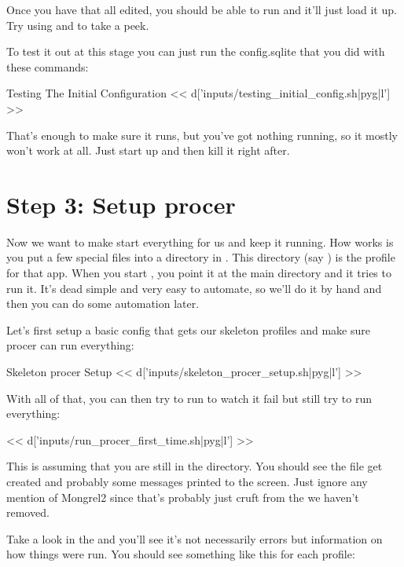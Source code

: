 Once you have that all edited, you should be able to run  and it'll just load it up.  Try using
 and  to take a peek.


To test it out at this stage you can just run the config.sqlite that you
did with these commands:

\begin{code}{Testing The Initial Configuration}
<< d['inputs/testing_initial_config.sh|pyg|l'] >>
\end{code}

That's enough to make sure it runs, but you've got nothing running,
so it mostly won't work at all.  Just start up and then kill it
right after.


\section{Step 3: Setup procer}

Now we want to make  start everything for us and keep
it running.  How  works is you put a few special
files into a directory in .  This directory (say )
is the profile for that app.  When you start , you
point it at the main  directory and it tries to run it.
It's dead simple and very easy to automate, so we'll do it by hand
and then you can do some automation later.

Let's first setup a basic config that gets our skeleton profiles
and make sure procer can run everything:

\begin{code}{Skeleton procer Setup}
<< d['inputs/skeleton_procer_setup.sh|pyg|l'] >>
\end{code}

With all of that, you can then try to run  to watch
it fail but still try to run everything:

<< d['inputs/run_procer_first_time.sh|pyg|l'] >>

This is assuming that you are still in the  directory.
You should see the file  get created and
probably some messages printed to the screen.  Just ignore any
mention of Mongrel2 since that's probably just cruft from the 
we haven't removed.

Take a look in the  and you'll see it's not necessarily
errors but information on how things were run.  You should
see something like this for each profile:

